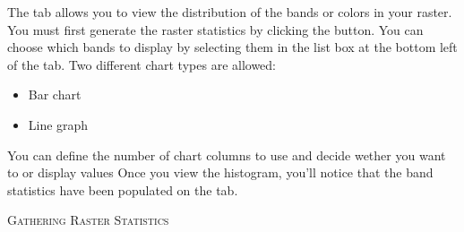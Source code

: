 The  tab allows you to view the distribution 
of the bands or colors in your raster. You must first generate the raster statistics 
by clicking the  button. You can choose which bands to display by 
selecting them in the list box at the bottom left of the tab. Two different
chart types are allowed: 

\begin{itemize}
\item Bar chart
\item Line graph
\end{itemize}

You can define the number of chart columns to use and decide wether you want 
to  or display  values 
Once you view the histogram, you'll notice that the band statistics have been
populated on the  tab.

\begin{Tip}\caption{\textsc{Gathering Raster Statistics}}
\end{Tip}

